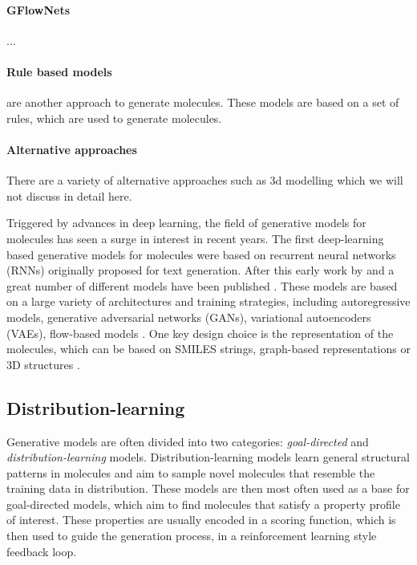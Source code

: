 \paragraph{GFlowNets} ...

\paragraph{Rule based models} are another approach to generate molecules. These
models are based on a set of rules, which are used to generate molecules.

\paragraph{Alternative approaches} There are a variety of alternative approaches
such as 3d modelling which we will not discuss in detail here.
    
Triggered by advances in deep learning, the field of generative models for
molecules has seen a surge in interest in recent years. The first deep-learning
based generative models for molecules were based on recurrent neural networks
(RNNs) originally proposed for text generation. After this early work by
\citep{seglerGeneratingFocusedMolecule2018} and
\citep{gomez-bombarelliAutomaticChemicalDesign2018} a great number of different
models have been published
\citep{eltonDeepLearningMolecular2019,sanchez-lengelingInverseMolecularDesign2018}.
These models are based on a large variety of architectures and training
strategies, including autoregressive models, generative adversarial networks
(GANs), variational autoencoders (VAEs), flow-based models
\citep{madhawaGraphNVPInvertibleFlow2019}. One key design choice is the
representation of the molecules, which can be based on SMILES strings,
graph-based representations or 3D structures
\citep{eltonDeepLearningMolecular2019,sanchez-lengelingInverseMolecularDesign2018,pangDeepGenerativeModels2024}.

\subsection{Distribution-learning}
Generative models are often divided into two categories: \emph{goal-directed}
and \emph{distribution-learning} models. Distribution-learning models learn
general structural patterns in molecules and aim to sample novel molecules that
resemble the training data in distribution. These models are then most often
used as a base for goal-directed models, which aim to find molecules that
satisfy a property profile of interest. These properties are usually encoded in
a scoring function, which is then used to guide the generation process, in a
reinforcement learning style feedback loop.

